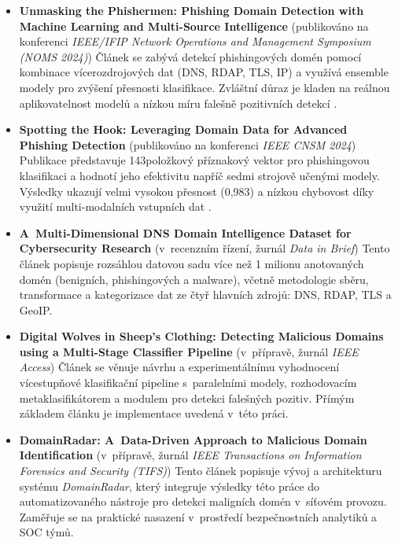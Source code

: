 \begin{itemize}
    \item \textbf{Unmasking the Phishermen: Phishing Domain Detection with Machine Learning and Multi-Source Intelligence}  
    (publikováno na konferenci \textit{IEEE/IFIP Network Operations and Management Symposium (NOMS 2024)})  
    Článek se zabývá detekcí phishingových domén pomocí kombinace vícerozdrojových dat (DNS, RDAP, TLS, IP) a využívá ensemble modely pro zvýšení přesnosti klasifikace. Zvláštní důraz je kladen na reálnou aplikovatelnost modelů a nízkou míru falešně pozitivních detekcí \cite{noms}.

    \item \textbf{Spotting the Hook: Leveraging Domain Data for Advanced Phishing Detection}  
    (publikováno na konferenci \textit{IEEE CNSM 2024})  
    Publikace představuje 143položkový příznakový vektor pro phishingovou klasifikaci a hodnotí jeho efektivitu napříč sedmi strojově učenými modely. Výsledky ukazují velmi vysokou přesnost (0{,}983) a nízkou chybovost díky využití multi-modalních vstupních dat \cite{CNSM}.

    \item \textbf{A~Multi-Dimensional DNS Domain Intelligence Dataset for Cybersecurity Research}  
    (v~recenzním řízení, žurnál \textit{Data in Brief})  
    Tento článek popisuje rozsáhlou datovou sadu více než 1 milionu anotovaných domén (benigních, phishingových a malware), včetně metodologie sběru, transformace a kategorizace dat ze čtyř hlavních zdrojů: DNS, RDAP, TLS a GeoIP.

    \item \textbf{Digital Wolves in Sheep’s Clothing: Detecting Malicious Domains using a Multi-Stage Classifier Pipeline}  
    (v~přípravě, žurnál \textit{IEEE Access})  
    Článek se věnuje návrhu a experimentálnímu vyhodnocení vícestupňové klasifikační pipeline s~paralelními modely, rozhodovacím metaklasifikátorem a modulem pro detekci falešných pozitiv. Přímým základem článku je implementace uvedená v~této práci.

    \item \textbf{DomainRadar: A~Data-Driven Approach to Malicious Domain Identification}  
    (v~přípravě, žurnál \textit{IEEE Transactions on Information Forensics and Security (TIFS)})  
    Tento článek popisuje vývoj a architekturu systému \textit{DomainRadar}, který integruje výsledky této práce do automatizovaného nástroje pro detekci maligních domén v~síťovém provozu. Zaměřuje se na praktické nasazení v~prostředí bezpečnostních analytiků a SOC týmů.
\end{itemize}

